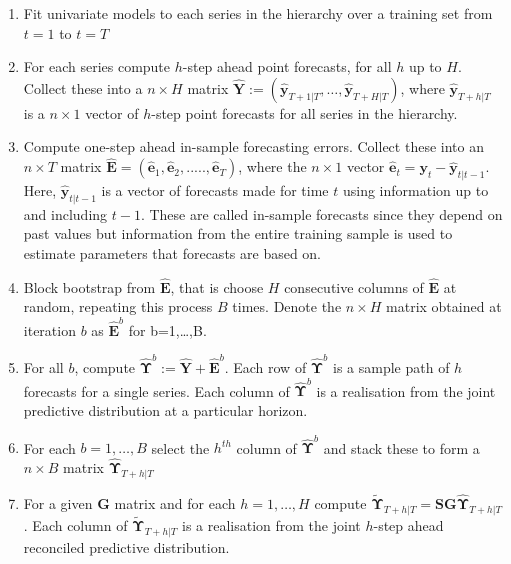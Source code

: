 \documentclass[graybox]{svmult}
\begin{document}
\begin{enumerate}
	\item Fit univariate models to each series in the hierarchy over a training set from $t=1$ to $t=T$
	\item For each series compute $h$-step ahead point forecasts, for all $h$ up to $H$. Collect these into a $n\times H$ matrix $\hat{\bm Y}:=(\hat{\bm{y}}_{T+1|T},\ldots,\hat{\bm{y}}_{T+H|T})$, where $\hat{\bm{y}}_{T+h|T}$ is a $n\times 1$ vector of $h$-step point forecasts for all series in the hierarchy.
	\item Compute one-step ahead in-sample forecasting errors. Collect these into an $n \times T$ matrix ${\hat{\bm E}}=(\hat{\bm{e}}_1,\hat{\bm{e}}_2,.....,\hat{\bm{e}}_T)$, where the $n\times 1$ vector $\hat{\bm{e}}_t={\bm y}_t-\hat{\bm {y}}_{t|t-1}$.  Here, $\hat{\bm {y}}_{t|t-1}$ is a vector of forecasts made for time $t$ using information up to and including $t-1$. These are called in-sample forecasts since they depend on past values but information from the entire training sample is used to estimate parameters that forecasts are based on.
	\item Block bootstrap from $\hat{\bm{E}}$, that is choose $H$ consecutive columns of $\hat{{\bm E}}$ at random, repeating this process $B$ times.  Denote the $n\times H$ matrix obtained at iteration $b$ as $\hat{{\bm E}}^b$ for b=1,\ldots,B.
	\item For all $b$, compute $\hat{\bm \Upsilon}^b:=\hat{\bm Y}+{\bm \hat{\bm{E}}}^b$. Each row of $\hat{\bm \Upsilon}^b$ is a sample path of $h$ forecasts for a single series.  Each column of $\hat{\bm \Upsilon}^b$ is a realisation from the joint predictive distribution at a particular horizon.
	\item For each $b=1,\ldots,B$ select the $h^{th}$ column of $\hat{\bm \Upsilon}^b$ and stack these to form a $n\times B$ matrix $\hat{\bm{\Upsilon}}_{T+h|T}$
	\item For a given ${\bm G}$ matrix and for each $h=1,\ldots,H$ compute $\tilde{\bm{\Upsilon}}_{T+h|T}={\bm S}{\bm G}\hat{\bm{\Upsilon}}_{T+h|T}$.   Each column of $\tilde{\bm \Upsilon}_{T+h|T}$ is a realisation from the joint $h$-step ahead reconciled predictive distribution.
\end{enumerate}


\end{document}
